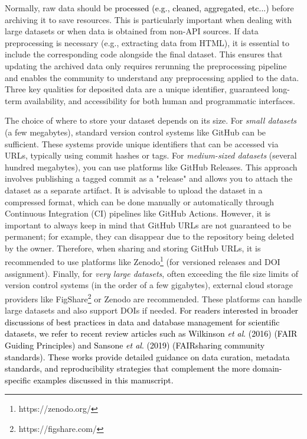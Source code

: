 \documentclass[9pt,lessons]{livecoms}
\newcommand{\revision}[1]{\textcolor{black}{#1}}
\begin{document}
Normally, raw data should be \revision{processed (e.g., cleaned, aggregated, etc...)} before archiving it to save resources. This is particularly important when dealing with large datasets or when data is obtained from non-API sources.
If data preprocessing is necessary (e.g., extracting data from HTML), it is essential to include the corresponding code alongside the final dataset. 
This ensures that updating the archived data only requires rerunning the preprocessing pipeline and enables the community to understand any preprocessing applied to the data. 
Three key qualities for deposited data are a unique identifier, guaranteed long-term availability, and accessibility for both human and programmatic interfaces.

The choice of where to store your dataset depends on its size. 
For \textit{small datasets} (a few megabytes), standard version control systems like GitHub can be sufficient. 
These systems provide unique identifiers that can be accessed via URLs, typically using commit hashes or tags. 
For \textit{medium-sized datasets} (several hundred megabytes), you can use platforms like GitHub Releases. This approach involves publishing a tagged commit as a "release" and allows you to attach the dataset as a separate artifact. It is advisable to upload the dataset in a compressed format, which can be done manually or automatically through Continuous Integration (CI) pipelines like GitHub Actions.
However, it is important to always keep in mind that GitHub URLs are not guaranteed to be permanent; for example, they can disappear due to the repository being deleted by the owner. Therefore, when sharing and storing GitHub URLs, it is recommended to use platforms like Zenodo\footnote{https://zenodo.org/}  (for versioned releases and DOI assignment). 
    Finally, for \textit{very large datasets}, often exceeding the file size limits of version control systems (in the order of a few gigabytes), external cloud storage providers like FigShare\footnote{https://figshare.com/} or Zenodo are recommended. These platforms can handle large datasets and also support DOIs if needed. \revision{For readers interested in broader discussions of best practices in data and database management for scientific datasets, we refer to recent review articles such as Wilkinson \textit{et al}. (2016)  \cite{wilkinson2016fair} (FAIR Guiding Principles) and Sansone \textit{et al}. (2019) \cite{sansone2019fairsharing} (FAIRsharing community standards). These works provide detailed guidance on data curation, metadata standards, and reproducibility strategies that complement the more domain-specific examples discussed in this manuscript. }
\end{document}
